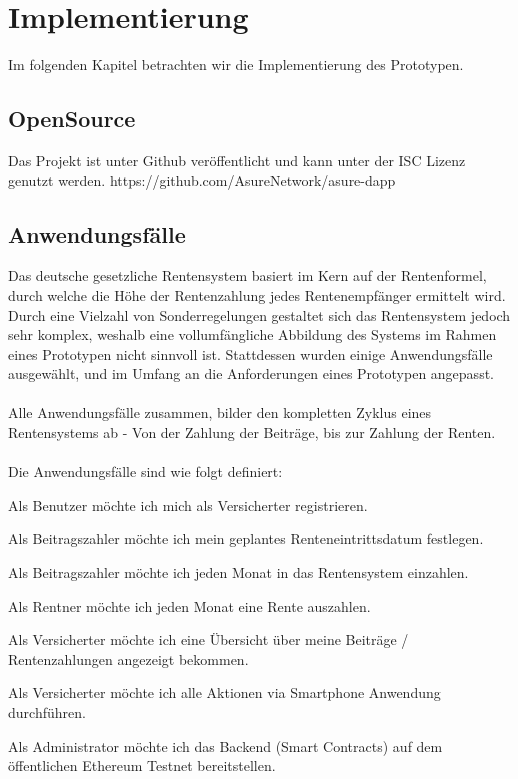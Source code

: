 \section{Implementierung}
Im folgenden Kapitel betrachten wir die Implementierung des Prototypen.


\subsection{OpenSource}
Das Projekt ist unter Github veröffentlicht und kann unter der ISC Lizenz genutzt werden.
https://github.com/AsureNetwork/asure-dapp


\subsection{Anwendungsfälle}
Das deutsche gesetzliche Rentensystem basiert im Kern auf der Rentenformel, durch welche die Höhe der Rentenzahlung jedes Rentenempfänger ermittelt wird. Durch eine Vielzahl von Sonderregelungen gestaltet sich das Rentensystem jedoch sehr komplex, weshalb eine vollumfängliche Abbildung des Systems im Rahmen eines Prototypen nicht sinnvoll ist. Stattdessen wurden einige Anwendungsfälle ausgewählt, und im Umfang an die Anforderungen eines Prototypen angepasst.

\paragraph{}
Alle Anwendungsfälle zusammen, bilder den kompletten Zyklus eines Rentensystems ab - Von der Zahlung der Beiträge, bis zur Zahlung der Renten.

\paragraph{}
Die Anwendungsfälle sind wie folgt definiert:

\begin{compactenum}
\item Als Benutzer möchte ich mich als Versicherter registrieren.
\item Als Beitragszahler möchte ich mein geplantes Renteneintrittsdatum festlegen.
\item Als Beitragszahler möchte ich jeden Monat in das Rentensystem einzahlen.
\item Als Rentner möchte ich jeden Monat eine Rente auszahlen.
\item Als Versicherter möchte ich eine Übersicht über meine Beiträge / Rentenzahlungen angezeigt bekommen.
\item Als Versicherter möchte ich alle Aktionen via Smartphone Anwendung durchführen.
\item Als Administrator möchte ich das Backend (Smart Contracts) auf dem öffentlichen Ethereum Testnet bereitstellen.
\end{compactenum}


